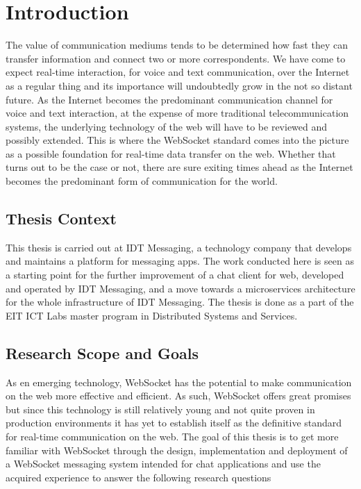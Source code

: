 \chapter{Introduction}
\label{chapter:intro}

The value of communication mediums tends to be determined how fast they can transfer information and connect two or more correspondents. We have come to expect real-time interaction, for voice and text communication, over the Internet as a regular thing and its importance will undoubtedly  grow in the not so distant future. As the Internet becomes the predominant communication channel for voice and text interaction, at the expense of more traditional telecommunication systems, the underlying technology of the web will have to be reviewed and possibly extended. This is where the WebSocket standard comes into the picture as a possible foundation for real-time data transfer on the web. Whether that turns out to be the case or not, there are sure exiting times ahead as the Internet becomes the predominant form of communication for the world.

\section{Thesis Context}

This thesis is carried out at IDT Messaging, a technology company that develops and maintains a platform for messaging apps. The work conducted here is seen as a starting point for the further improvement of a chat client for web, developed and operated by IDT Messaging, and a move towards a microservices architecture for the whole infrastructure of IDT Messaging. The thesis is done as a part of the EIT ICT Labs master program in Distributed Systems and Services.

\section{Research Scope and Goals}

As en emerging technology, WebSocket has the potential to make communication on the web more effective and efficient. As such, WebSocket offers great promises but since this technology is still relatively young and not quite proven in production environments it has yet to establish itself as the definitive standard for real-time communication on the web. The goal of this thesis is to get more familiar with WebSocket through the design, implementation and deployment of a WebSocket messaging system intended for chat applications and use the acquired experience to answer the following research questions

